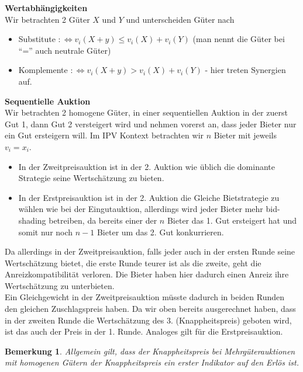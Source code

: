 \documentclass[12pt]{extreport} %
\theoremstyle{named}
\theoremstyle{itshape}
\theoremstyle{normal}
\newtheorem*{bemerkung}{Bemerkung}
\begin{document}
\textbf{Wertabhängigkeiten} ~\\
Wir betrachten 2 Güter $X$ und $Y$ und unterscheiden Güter nach
\begin{itemize}
	\item Substitute  $:\iff v_{i}(X + y) \leq v_{i}(X) + v_{i}(Y)$  (man nennt die Güter bei \enquote{=} auch neutrale Güter)  
	\item Komplemente $:\iff v_{i}(X + y)   >  v_{i}(X) + v_{i}(Y)$ - hier treten Synergien auf.
\end{itemize}


\textbf{Sequentielle Auktion} ~\\
Wir betrachten 2 homogene Güter, in einer sequentiellen Auktion in der zuerst Gut 1, dann Gut 2 versteigert wird und nehmen vorerst an, dass jeder Bieter nur ein Gut ersteigern will. Im IPV Kontext betrachten wir $n$ Bieter mit jeweils $v_{i} = x_{i}$. 


\begin{itemize}
	\item In der Zweitpreisauktion ist in der 2. Auktion wie üblich die dominante Strategie seine Wertschätzung zu bieten. 
	\item In der Erstpreisauktion ist in der 2. Auktion die Gleiche Bietstrategie zu wählen wie bei der Eingutauktion, allerdings wird jeder Bieter mehr bid-shading betreiben, da bereits einer der $n$ Bieter das 1. Gut ersteigert hat und somit nur noch $n-1$ Bieter um das 2. Gut konkurrieren.
\end{itemize}

Da allerdings in der Zweitpreisauktion, falls jeder auch in der ersten Runde seine Wertschätzung bietet, die erste Runde teurer ist als die zweite, geht die Anreizkompatibilität verloren. Die Bieter haben hier dadurch einen Anreiz ihre Wertschätzung zu unterbieten. ~\\

Ein Gleichgewicht in der Zweitpreisauktion müsste dadurch in beiden Runden den gleichen Zuschlagspreis haben. Da wir oben bereits ausgerechnet haben, dass in der zweiten Runde die Wertschätzung des 3. (Knappheitspreis) geboten wird, ist das auch der Preis in der 1. Runde. Analoges gilt für die Erstpreisauktion. ~\\

\begin{bemerkung}
	Allgemein gilt, dass der Knappheitspreis bei Mehrgüterauktionen mit homogenen Gütern der Knappheitspreis ein erster Indikator auf den Erlös ist.
\end{bemerkung}
\end{document}
